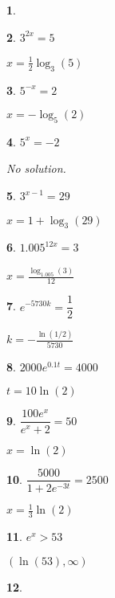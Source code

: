 \documentclass{amsbook}
\newtheorem{exc}{}
\newenvironment{ex}{\begin{exc}\normalfont}{\end{exc}}
\numberwithin{section}{chapter}
\numberwithin{equation}{chapter}
\begin{document}
\begin{multicols}{3}
\begin{ex}
\begin{sol}
		[This means $x=-1$ or $x=0$ or $x=1$.]
	\end{sol}
\end{ex}
	\begin{ex}
	$3^{2x}=5$
	\begin{sol}
		$x=\frac{1}{2}\log_3(5)$
	\end{sol}
\end{ex}
	\begin{ex}
	$5^{-x}=2$
	\begin{sol}
		$x=-\log_5 (2)$
	\end{sol}
\end{ex}
	\begin{ex}
	$5^{x}=-2$
	\begin{sol}
		No solution.
	\end{sol}
\end{ex}
	\begin{ex}
	$3^{x-1}=29$
	\begin{sol}
		$x=1+\log_3(29)$
	\end{sol}
\end{ex}
	\begin{ex}
	$1.005^{12x}=3$
	\begin{sol}
		$x=\frac{\log_{1.005}(3)}{12}$
	\end{sol}
\end{ex}
	\begin{ex}
	$e^{-5730k}=\dfrac{1}{2}$
	\begin{sol}
		$k=-\frac{\ln(1/2)}{5730}$
	\end{sol}
\end{ex}
	\begin{ex}
	$2000e^{0.1t}=4000$
	\begin{sol}
		$t=10\ln(2)$
	\end{sol}
\end{ex}
	\begin{ex}
	$\dfrac{100e^x}{e^x+2} = 50$
	\begin{sol}
		$x = \ln(2)$
	\end{sol}
\end{ex}
	\begin{ex}
	$\dfrac{5000}{1+2e^{-3t}} = 2500$
	\begin{sol}
		$x = \frac{1}{3}\ln(2)$
	\end{sol}
\end{ex}
\begin{ex}
	$e^x>53$
	\begin{sol}
		$(\ln(53),\infty)$
	\end{sol}
\end{ex}
\begin{ex}

\end{ex}
\end{multicols}
\end{document}
